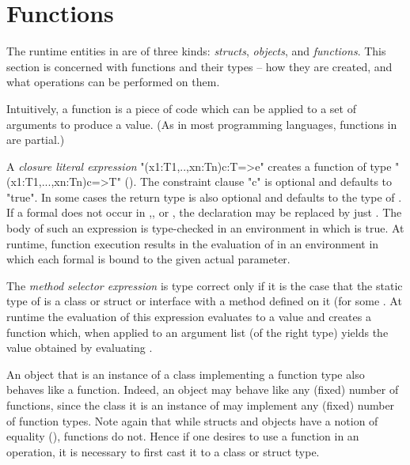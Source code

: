 \section{Functions}
\label{Functions}
\label{functions}

The runtime entities in \Xten{} are of three kinds: \emph{structs},
\emph{objects}, and \emph{functions}. This section is concerned with
functions and their types -- how they are created, and what operations
can be performed on them.

Intuitively, a function is a piece of code which can be applied to a
set of arguments to produce a value. (As in most programming
languages, functions in \Xten{} are partial.)

A \emph{closure literal expression} 
\xcd"(x1:T1,..,xn:Tn){c}:T=>e"
creates a function of type \xcd"(x1:T1,...,xn:Tn){c}=>T" (). The constraint
clause \xcd"{c}" is optional and defaults to \xcd"{true}". In some cases the
return type  is also optional and defaults to the type of . If a
formal  does not occur in ,, or , the declaration  may be
replaced by just . The body  of such an expression is type-checked
in an environment in which  is true. At runtime, function execution
results in the evaluation of  in an environment in which each formal
is bound to the given actual parameter.

The \emph{method selector expression}  is type
correct only if it is the case that the static type of  is a
class or struct or interface with a method
 defined on it (for some
. At runtime the evaluation of this expression
evaluates  to a value  and creates a function 
which, when applied to an argument list  (of the right
type) yields the value obtained by evaluating .


An object  that is an instance of a class implementing a function
type  also behaves like a function. Indeed, an
object may behave like any (fixed) number of functions, since the
class it is an instance of may implement any (fixed) number of
function types. Note again that while structs and objects have a
notion of equality (\Xcd{==}), functions do not. Hence if one desires to use
a function  in an \Xcd{==} operation, it is necessary to first cast it to a
class or struct type.


  
%


